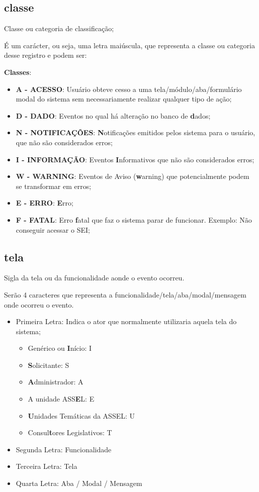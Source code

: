 \subsection{classe}

Classe ou categoria de classificação;

É um carácter, ou seja, uma letra maiúscula, que representa a classe ou categoria desse registro e podem ser:

\textbf{Classes}:
\begin{itemize}
	\item \textbf{A - ACESSO}: Usuário obteve cesso a uma tela/módulo/aba/formulário modal do sistema sem necessariamente realizar qualquer tipo de ação;
	\item \textbf{D - DADO}: Eventos no qual há alteração no banco de \textbf{d}ados;
	\item \textbf{N - NOTIFICAÇÕES}: \textbf{N}otificações emitidos pelos sistema para o usuário, que não são considerados erros;
	\item \textbf{I - INFORMAÇÃO}: Eventos \textbf{I}nformativos que não são considerados erros;
	\item \textbf{W - WARNING}: Eventos de Aviso (\textbf{w}arning) que potencialmente podem se transformar em erros;
	\item \textbf{E - ERRO}: \textbf{E}rro;
	\item \textbf{F - FATAL}: Erro \textbf{f}atal que faz o sistema parar de funcionar. Exemplo: Não conseguir acessar o SEI;
\end{itemize}

\subsection{tela}

Sigla da tela ou da funcionalidade aonde o evento ocorreu.

Serão 4 caracteres que representa a funcionalidade/tela/aba/modal/mensagem onde ocorreu o evento. 

\begin{itemize}
	\item Primeira Letra: Indica o ator que normalmente utilizaria aquela tela do sistema;
	\begin{itemize}
		\item Genérico ou \textbf{I}nício: I
		\item \textbf{S}olicitante: S
		\item \textbf{A}dministrador: A		
		\item A unidade ASS\textbf{E}L: E
		\item \textbf{U}nidades Temáticas da ASSEL: U
		\item Consul\textbf{t}ores Legislativos: T
	\end{itemize}
	\item Segunda Letra: Funcionalidade
	\item Terceira Letra: Tela
	\item Quarta Letra: Aba / Modal / Mensagem
\end{itemize}


